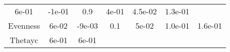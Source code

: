 \documentclass[12pt,]{article}
\begin{document}
\begin{longtable}[]{@{}ccccccc@{}}
\begin{minipage}[t]{0.09\columnwidth}
6e-01\strut
\end{minipage} & \begin{minipage}[t]{0.11\columnwidth}\centering\strut
-1e-01\strut
\end{minipage} & \begin{minipage}[t]{0.08\columnwidth}\centering\strut
0.9\strut
\end{minipage} & \begin{minipage}[t]{0.10\columnwidth}\centering\strut
4e-01\strut
\end{minipage} & \begin{minipage}[t]{0.07\columnwidth}\centering\strut
4.5e-02\strut
\end{minipage} & \begin{minipage}[t]{0.09\columnwidth}\centering\strut
1.3e-01\strut
\end{minipage}\tabularnewline
\begin{minipage}[t]{0.26\columnwidth}\centering\strut
Evenness\strut
\end{minipage} & \begin{minipage}[t]{0.09\columnwidth}\centering\strut
6e-02\strut
\end{minipage} & \begin{minipage}[t]{0.11\columnwidth}\centering\strut
-9e-03\strut
\end{minipage} & \begin{minipage}[t]{0.08\columnwidth}\centering\strut
0.1\strut
\end{minipage} & \begin{minipage}[t]{0.10\columnwidth}\centering\strut
5e-02\strut
\end{minipage} & \begin{minipage}[t]{0.07\columnwidth}\centering\strut
1.0e-01\strut
\end{minipage} & \begin{minipage}[t]{0.09\columnwidth}\centering\strut
1.6e-01\strut
\end{minipage}\tabularnewline
\begin{minipage}[t]{0.26\columnwidth}\centering\strut
Thetayc\strut
\end{minipage} & \begin{minipage}[t]{0.09\columnwidth}\centering\strut
6e-01\strut
\end{minipage} & \begin{minipage}[t]{0.11\columnwidth}\centering\strut
6e-01\strut
\end{minipage} & \begin{minipage}[t]{0.08\columnwidth}\centering\strut

\end{minipage}
\end{longtable}
\end{document}
